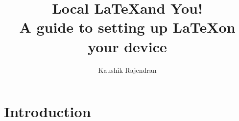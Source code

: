 \documentclass[titlepage]{article}
\title{\textbf{Local \LaTeX and You!} \\ A guide to setting up \LaTeX on your device}
\author{Kaushik Rajendran}
\begin{document}
\maketitle
\tableofcontents
\newpage

\section{Introduction}

\clearpage
\end{document}

